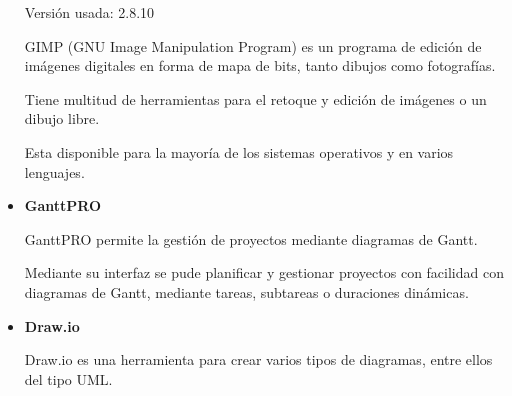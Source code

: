 \begin{itemize}
	Versión usada: 2.8.10
		
	GIMP (GNU Image Manipulation Program) \cite{gimp} es un programa de edición de imágenes digitales en forma de mapa de bits, tanto dibujos como fotografías. 

	Tiene multitud de herramientas para el retoque y edición de imágenes o un dibujo libre.

	Esta disponible para la mayoría de los sistemas operativos y en varios lenguajes.

	
	\bigskip
	\item \textbf{GanttPRO}
	
	GanttPRO \cite{ganttpro} permite la gestión de proyectos mediante diagramas de Gantt.

	Mediante su interfaz se pude planificar y gestionar proyectos con facilidad con diagramas de Gantt, mediante tareas, subtareas o duraciones dinámicas. 	


	\bigskip
	\item \textbf{Draw.io}
	
	Draw.io \cite{drawioweb} es una herramienta para crear varios tipos de diagramas, entre ellos del tipo UML.
	

					
\end{itemize}

